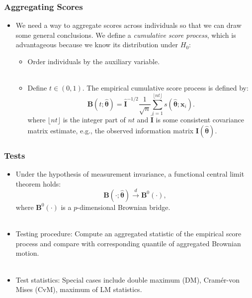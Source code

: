 \documentclass{beamer}
\begin{document}
\begin{frame}[fragile]
  \frametitle{Aggregating Scores}
  \begin{itemize}
    \item We need a way to aggregate scores across individuals so that we
      can draw some general conclusions.  We define a {\em cumulative score
      process}, which is advantageous because we know its distribution
      under $H_0$:
      \begin{itemize}
        \item Order individuals by the auxiliary variable.\\ \ \\
        \item Define $t \in (0, 1)$.
          The empirical cumulative score process is defined by:\\
  \begin{equation*}
    \bm{B}(t; \hat{\bm{\theta}}) = 
      {\bm{\widehat I}}^{-1/2} \frac{1}{\sqrt{n}}
    \displaystyle\sum_{i=1}^{\lfloor nt 
      \rfloor} s(\hat{\bm{\theta}} ; \bm{x}_i).
    \end{equation*}
  where $\lfloor nt \rfloor$ is the integer part of $nt$
  and $\bm{\widehat I}$ is some consistent covariance matrix estimate, e.g.,
  the observed information matrix ${\bm{I}}(\widehat{{\bm{\theta}}})$.
      \end{itemize}
  \end{itemize}
\end{frame}


\begin{frame}[fragile]
  \frametitle{Tests}
  \begin{itemize}
    \item Under the hypothesis of
      measurement invariance, a functional central limit
      theorem holds:
  \begin{equation*}
  {\bm{B}}(\cdot; \widehat{{\bm{\theta}}}) \overset{d}{\rightarrow} {\bm B}^{0}(\cdot),
  \end{equation*}
 where ${\bm B}^{0}(\cdot)$ is a $p$-dimensional Brownian bridge.\\ \ \\

   \item Testing procedure: Compute an aggregated statistic of the empirical
     score process and compare with corresponding quantile of aggregated
     Brownian motion.\\ \ \\

    \item Test statistics: Special cases include double maximum (DM),
      Cram\'er-von Mises (CvM), maximum of LM statistics.
  \end{itemize}
\end{frame}
\end{document}
